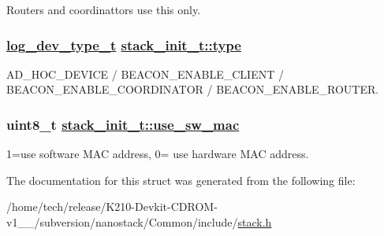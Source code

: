 Routers and coordinattors use this only. \hypertarget{structstack__init__t_6ac3dd68e3b2e8d832bd4783621dd4e6}{
\subsubsection[type]{\setlength{\rightskip}{0pt plus 5cm}\hyperlink{stack_8h_2af35922006e25ad6270937397391c79}{log\_\-dev\_\-type\_\-t} \hyperlink{structstack__init__t_6ac3dd68e3b2e8d832bd4783621dd4e6}{stack\_\-init\_\-t::type}}}
\label{structstack__init__t_6ac3dd68e3b2e8d832bd4783621dd4e6}


AD\_\-HOC\_\-DEVICE / BEACON\_\-ENABLE\_\-CLIENT / BEACON\_\-ENABLE\_\-COORDINATOR / BEACON\_\-ENABLE\_\-ROUTER. \hypertarget{structstack__init__t_f2ce0b6ca35ce13964f9bfe6b728f68a}{
\subsubsection[use\_\-sw\_\-mac]{\setlength{\rightskip}{0pt plus 5cm}uint8\_\-t \hyperlink{structstack__init__t_f2ce0b6ca35ce13964f9bfe6b728f68a}{stack\_\-init\_\-t::use\_\-sw\_\-mac}}}
\label{structstack__init__t_f2ce0b6ca35ce13964f9bfe6b728f68a}


1=use software MAC address, 0= use hardware MAC address. 

The documentation for this struct was generated from the following file:\begin{CompactItemize}
\item 
/home/tech/release/K210-Devkit-CDROM-v1\_\_/subversion/nanostack/Common/include/\hyperlink{stack_8h}{stack.h}\end{CompactItemize}
